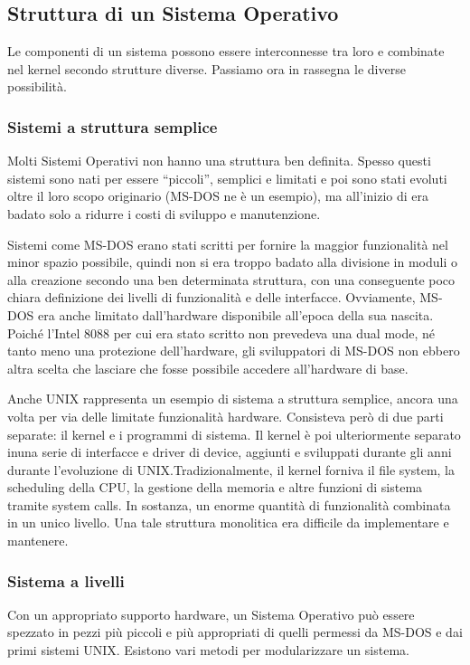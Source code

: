 \documentclass[a4paper]{article}
\begin{document}
\subsection{Struttura di un Sistema Operativo}
Le componenti di un sistema possono essere interconnesse tra loro e combinate nel kernel secondo strutture diverse. Passiamo ora in rassegna le diverse possibilità.

\subsubsection{Sistemi a struttura semplice}
Molti Sistemi Operativi non hanno una struttura ben definita. Spesso questi sistemi sono nati per essere ``piccoli'', semplici e limitati e poi sono stati evoluti oltre il loro scopo originario (MS-DOS ne è un esempio), ma all'inizio di era badato solo a ridurre i costi di sviluppo e manutenzione.

Sistemi come MS-DOS erano stati scritti per fornire la maggior funzionalità nel minor spazio possibile, quindi non si era troppo badato alla divisione in moduli o alla creazione secondo una ben determinata struttura, con una conseguente poco chiara definizione dei livelli di funzionalità e delle interfacce. Ovviamente, MS-DOS era anche limitato dall'hardware disponibile all'epoca della sua nascita. Poiché l'Intel 8088 per cui era stato scritto non prevedeva una dual mode, né tanto meno una protezione dell'hardware, gli sviluppatori di MS-DOS non ebbero altra scelta che lasciare che fosse possibile accedere all'hardware di base.

Anche UNIX rappresenta un esempio di sistema a struttura semplice, ancora una volta per via delle limitate funzionalità hardware. Consisteva però di due parti separate: il kernel e i programmi di sistema. Il kernel è poi ulteriormente separato inuna serie di interfacce e driver di device, aggiunti e sviluppati durante gli anni durante l'evoluzione di UNIX.Tradizionalmente, il kernel forniva il file system, la scheduling della CPU, la gestione della memoria e altre funzioni di sistema tramite system calls. In sostanza, un enorme quantità di funzionalità combinata in un unico livello. Una tale struttura monolitica era difficile da implementare e mantenere.

\subsubsection{Sistema a livelli}
Con un appropriato supporto hardware, un Sistema Operativo può essere spezzato in pezzi più piccoli e più appropriati di quelli permessi da MS-DOS e dai primi sistemi UNIX. Esistono vari metodi per modularizzare un sistema.
\end{document}
